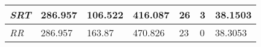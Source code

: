 \documentclass{article}
\begin{document}
\begin{table}[h!]
\begin{tabular}{|l|l|l|l|l|l|l|}
  \textit{SRT}       & 286.957                                                                          & 106.522                                                                     & 416.087                                                                            & 26                                                                                    & 3                                                                                   & 38.1503                                                                    \\ \hline
  \textit{RR}        & 286.957                                                                          & 163.87                                                                      & 470.826                                                                            & 23                                                                                    & 0                                                                                   & 38.3053                                                                    \\ \hline
  \end{tabular}
\end{table}
\end{document}
